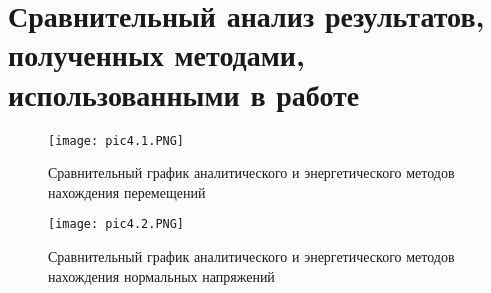\section{Сравнительный анализ результатов, полученных методами, использованными в работе}

\begin{figure}[H]
    \begin{center}
        \texttt{[image: pic4.1.PNG]}
        \caption{Сравнительный график аналитического и энергетического методов нахождения перемещений}
        \label{pic7.3.1}
    \end{center}
\end{figure}
\begin{figure}[H]
    \begin{center}
        \texttt{[image: pic4.2.PNG]}
        \caption{Сравнительный график аналитического и энергетического методов нахождения нормальных напряжений}
        \label{pic7.3.2}
    \end{center}
\end{figure}


